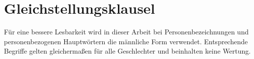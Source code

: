 \chapter*{Gleichstellungsklausel}
\thispagestyle{empty}
Für eine bessere Lesbarkeit wird in dieser Arbeit bei Personenbezeichnungen und personenbezogenen Hauptwörtern die männliche Form verwendet. Entsprechende Begriffe gelten gleichermaßen für alle Geschlechter und beinhalten keine Wertung.

